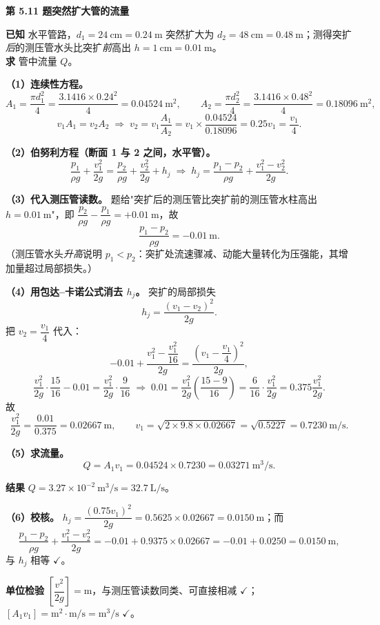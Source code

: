 \noindent\textbf{第 5.11 题\quad 突然扩大管的流量}

\begin{jie}
\textbf{已知} 水平管路，$d_1=24\ \mathrm{cm}=0.24\ \mathrm{m}$ 突然扩大为 $d_2=48\ \mathrm{cm}=0.48\ \mathrm{m}$；测得突扩\emph{后}的测压管水头比突扩\emph{前}高出 $h=1\ \mathrm{cm}=0.01\ \mathrm{m}$。\\
\textbf{求} 管中流量 $Q$。

\textbf{（1）连续性方程。}
\[A_1=\frac{\pi d_1^2}{4}=\frac{3.1416\times0.24^2}{4}=0.04524\ \mathrm{m^2},\qquad
A_2=\frac{\pi d_2^2}{4}=\frac{3.1416\times0.48^2}{4}=0.18096\ \mathrm{m^2},\]
\[v_1A_1=v_2A_2\;\Longrightarrow\;v_2=v_1\frac{A_1}{A_2}=v_1\times\frac{0.04524}{0.18096}=0.25v_1=\frac{v_1}{4}.\]

\textbf{（2）伯努利方程（断面 1 与 2 之间，水平管）。}
\[\frac{p_1}{\rho g}+\frac{v_1^2}{2g}=\frac{p_2}{\rho g}+\frac{v_2^2}{2g}+h_j
\;\Longrightarrow\;h_j=\frac{p_1-p_2}{\rho g}+\frac{v_1^2-v_2^2}{2g}.\]

\textbf{（3）代入测压管读数。} 题给"突扩后的测压管比突扩前的测压管水柱高出 $h=0.01\ \mathrm{m}$"，即 $\dfrac{p_2}{\rho g}-\dfrac{p_1}{\rho g}=+0.01\ \mathrm{m}$，故
\[\frac{p_1-p_2}{\rho g}=-0.01\ \mathrm{m}.\]
（测压管水头\emph{升高}说明 $p_1<p_2$：突扩处流速骤减、动能大量转化为压强能，其增加量超过局部损失。）

\textbf{（4）用包达--卡诺公式消去 $h_j$。} 突扩的局部损失
\[h_j=\frac{(v_1-v_2)^2}{2g}.\]
把 $v_2=\dfrac{v_1}{4}$ 代入：
\[-0.01+\frac{v_1^2-\dfrac{v_1^2}{16}}{2g}=\frac{\left(v_1-\dfrac{v_1}{4}\right)^2}{2g},\]
\[\frac{v_1^2}{2g}\cdot\frac{15}{16}-0.01=\frac{v_1^2}{2g}\cdot\frac{9}{16}
\;\Longrightarrow\;0.01=\frac{v_1^2}{2g}\left(\frac{15-9}{16}\right)=\frac{6}{16}\cdot\frac{v_1^2}{2g}=0.375\frac{v_1^2}{2g}.\]
故
\[\frac{v_1^2}{2g}=\frac{0.01}{0.375}=0.02667\ \mathrm{m},\qquad
v_1=\sqrt{2\times9.8\times0.02667}=\sqrt{0.5227}=0.7230\ \mathrm{m/s}.\]

\textbf{（5）求流量。}
\[Q=A_1v_1=0.04524\times0.7230=0.03271\ \mathrm{m^3/s}.\]

\textbf{结果} $\boxed{Q=3.27\times10^{-2}\ \mathrm{m^3/s}=32.7\ \mathrm{L/s}}$。

\textbf{（6）校核。} $h_j=\dfrac{(0.75v_1)^2}{2g}=0.5625\times0.02667=0.0150\ \mathrm{m}$；而
\[\frac{p_1-p_2}{\rho g}+\frac{v_1^2-v_2^2}{2g}=-0.01+0.9375\times0.02667=-0.01+0.0250=0.0150\ \mathrm{m},\]
与 $h_j$ 相等 $\checkmark$。

\textbf{单位检验} $\left[\dfrac{v^2}{2g}\right]=\mathrm{m}$，与测压管读数同类、可直接相减 $\checkmark$；$[A_1v_1]=\mathrm{m^2}\cdot\mathrm{m/s}=\mathrm{m^3/s}$ $\checkmark$。
\end{jie}
